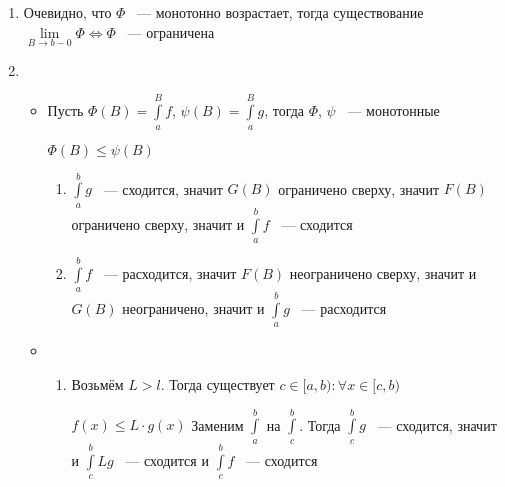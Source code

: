 \documentclass[../main.tex]{subfiles}
\begin{document}
            \begin{enumerate}
            
                \item Очевидно, что $\Phi$ ~--- монотонно возрастает, тогда существование $\lim\limits_{B \rightarrow b - 0} \Phi \Longleftrightarrow \Phi$ ~--- ограничена
                
                \item 
                
                    \begin{itemize}
                    
                        \item Пусть $\Phi(B) = \int\limits^B_a f$, $\psi(B) = \int\limits^B_a g$, тогда $\Phi$, $\psi$ ~--- монотонные 
                        
                            $\Phi(B) \leq \psi(B)$
                            
                            \begin{enumerate}
                            
                                \item $\int\limits^b_a g$ ~--- сходится, значит $G(B)$ ограничено сверху, значит $F(B)$ ограничено сверху, значит и $\int\limits^b_a f$ ~--- сходится
                                
                                \item $\int\limits^b_a f$ ~--- расходится, значит $F(B)$ неограничено сверху, значит и $G(B)$ неограничено, значит и $\int\limits^b_a g$ ~--- расходится
                                
                            \end{enumerate}
                        
                        \item 
                            
                            \begin{enumerate}
                            
                                \item Возьмём $L > l$. Тогда существует $c \in [a, b) : \forall x \in [c, b)$
                                
                                    $f(x) \leq L \cdot g(x)$ Заменим $\int\limits^b_a$ на $\int\limits^b_c$. Тогда $\int\limits^b_c g$ ~--- сходится, значит и $\int\limits^b_c L g$ ~--- сходится и $\int\limits^b_c f$ ~--- сходится
                                

\end{enumerate}
\end{itemize}
\end{enumerate}
\end{document}
